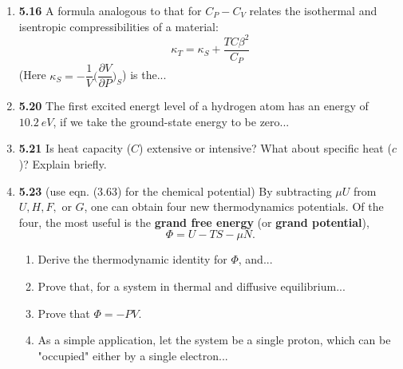 \documentclass[fleqn]{article}
\begin{document}
  \begin{enumerate}
    \item \textbf{5.16} A formula analogous to that for $C_P-C_V$ relates the isothermal and 
    isentropic compressibilities of a material:
    $$
      \kappa_T=\kappa_S+\dfrac{TC \beta^2}{C_P}
    $$
    (Here $\kappa_S=-\dfrac{1}{V} \bigg( \dfrac{\partial V}{\partial P} \bigg)_S $) is the...


    \item \textbf{5.20} The first excited energt level of a hydrogen atom has an energy of $10.2 ~ eV$, if
    we take the ground-state energy to be zero...


    \item \textbf{5.21} Is heat capacity ($C$) extensive or intensive? What about specific heat ($c$)?
    Explain briefly.


    \item \textbf{5.23} (use eqn. (3.63) for the chemical potential) By subtracting $\mu U$ from 
    $U, H, F,$ or $G$, one can obtain four new thermodynamics potentials. Of the four, the most useful
    is the \textbf{grand free energy} (or \textbf{grand potential}),
    $$
      \Phi=U-TS-\mu N.
    $$
    \begin{enumerate}
      \item Derive the thermodynamic identity for $\Phi$, and...


      \item Prove that, for a system in thermal and diffusive equilibrium...


      \item Prove that $\Phi=-PV$.


      \item As a simple application, let the system be a single proton, which can be "occupied"
      either by a single electron...


\end{enumerate}
\end{enumerate}
\end{document}
